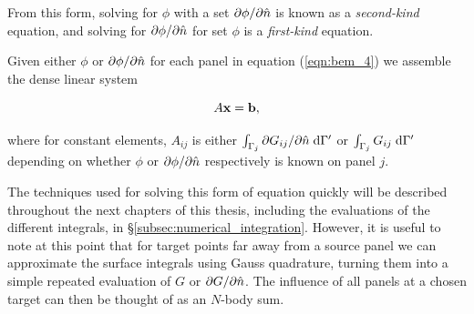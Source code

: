 From this form, solving for $\phi$ with a set $\partial \phi / \partial \hat{n}$ is known as a \emph{second-kind} equation, and solving for $\partial \phi / \partial \hat{n}$ for set $\phi$ is a \emph{first-kind} equation.

Given either $\phi$ or $\partial \phi / \partial \hat{n}$ for each panel in equation (\ref{eqn:bem_4}) we assemble the dense linear system

\begin{equation}
	A\mathbf{x} = \mathbf{b},
\end{equation}

\noindent
where for constant elements, $A_{ij}$ is either $\int_{\Gamma_{j}} \partial G_{ij} / \partial \hat{n}\;\text{d}\Gamma'$ or $\int_{\Gamma_{j}}G_{ij}\;\text{d}\Gamma'$ depending on whether $\phi$ or $\partial \phi / \partial \hat{n}$ respectively is known on panel $j$.

The techniques used for solving this form of equation quickly will be described throughout the next chapters of this thesis, including the evaluations of the different integrals, in \S\ref{subsec:numerical_integration}. However, it is useful to note at this point that for target points far away from a source panel we can approximate the surface integrals using Gauss quadrature, turning them into a simple repeated evaluation of $G$ or $\partial G / \partial \hat{n}$. The influence of all panels at a chosen target can then be thought of as an $N$-body sum.







